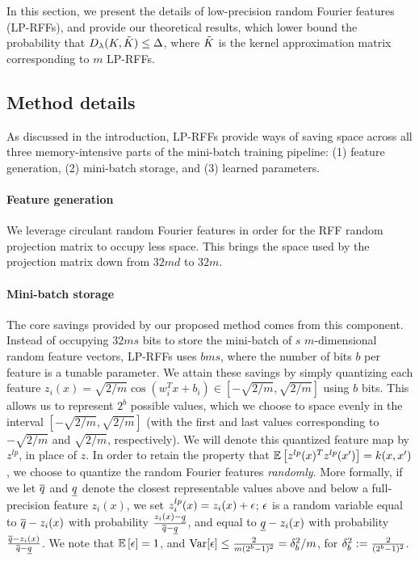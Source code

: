 In this section, we present the details of low-precision random Fourier features (LP-RFFs), and provide our theoretical results, which lower bound the probability that $D_{\lambda}(K,\tilde{K}) \leq \Delta$, where $\tilde{K}$ is the kernel approximation matrix corresponding to $m$ LP-RFFs.

\subsection{Method details}
\label{subsec:method_details}
As discussed in the introduction, LP-RFFs provide ways of saving space across all three memory-intensive parts of the mini-batch training pipeline: (1) feature generation, (2) mini-batch storage, and (3) learned parameters.

\paragraph{Feature generation} We leverage circulant random Fourier features \citep{yu15} in order for the RFF random projection matrix to occupy less space. This brings the space used by the projection matrix down from $32md$ to $32m$.

\paragraph{Mini-batch storage} The core savings provided by our proposed method comes from this component.  Instead of occupying $32ms$ bits to store the mini-batch of $s$ $m$-dimensional random feature vectors, LP-RFFs uses $bms$, where the number of bits $b$ per feature is a tunable parameter.  We attain these savings by simply quantizing each feature $z_i(x) = \sqrt{2/m}\cos(w_i^T x + b_i) \in [-\sqrt{2/m},\sqrt{2/m}]$ using $b$ bits.  This allows us to represent $2^b$ possible values, which we choose to space evenly in the interval $[-\sqrt{2/m},\sqrt{2/m}]$ (with the first and last values corresponding to $-\sqrt{2/m}$ and $\sqrt{2/m}$, respectively). We will denote this quantized feature map by $z^{lp}$, in place of $z$. In order to retain the property that $\expect{}{z^{lp}(x)^T z^{lp}(x')} = k(x,x')$, we choose to quantize the random Fourier features \textit{randomly}.  More formally, if we let $\overline{q}$ and $\underline{q}$ denote the closest representable values above and below a full-precision feature $z_i(x)$, we set $z^{lp}_i(x) = z_i(x) + \epsilon$; $\epsilon$ is a random variable equal to $\overline{q} - z_i(x)$ with probability $\frac{z_i(x)-\underline{q}}{\overline{q}-\underline{q}}$, and equal to $\underline{q} - z_i(x)$ with probability $\frac{\overline{q}-z_i(x)}{\overline{q}-\underline{q}}$.  We note that $\expect{}{\eps} = 1$, and ${\rm Var}[\epsilon] \leq \frac{2}{m(2^b-1)^2} = \delta_b^2/m$, for $\delta_b^2 := \frac{2}{(2^b-1)^2}$.

